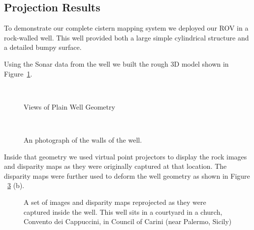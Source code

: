 \documentclass[a4paper,twoside]{article}
\begin{document}
\subsection{Projection Results}
To demonstrate our complete cistern mapping system we deployed our ROV in a rock-walled well.
This well provided both a large simple cylindrical structure and a detailed bumpy surface.

Using the Sonar data from the well we built the rough 3D model shown in Figure~\ref{fig:wellNoFine}. 

\begin{figure}[!h]
	\centering
		\quad %
		\\%

		\caption{Views of Plain Well Geometry}
		\label{fig:wellNoFine}
\end{figure}


\begin{figure}[!h]
	\centering
		\\%

		\caption{ An photograph of the walls of the well.}
		\label{fig:wellPhoto}
\end{figure}

Inside that geometry we used virtual point projectors to display the rock images and disparity maps as they were originally captured at that location.  
The disparity maps were further used to deform the well geometry as shown in Figure ~\ref{fig:result2} (b).

\begin{figure}[!h]
	\centering
		\quad %

		\caption{A set of images and disparity maps reprojected as they were captured inside the well. This well sits in a courtyard in a church, Convento dei Cappuccini, in Council of Carini (near Palermo, Sicily)}
		\label{fig:result2}
\end{figure}

%
\end{document}
